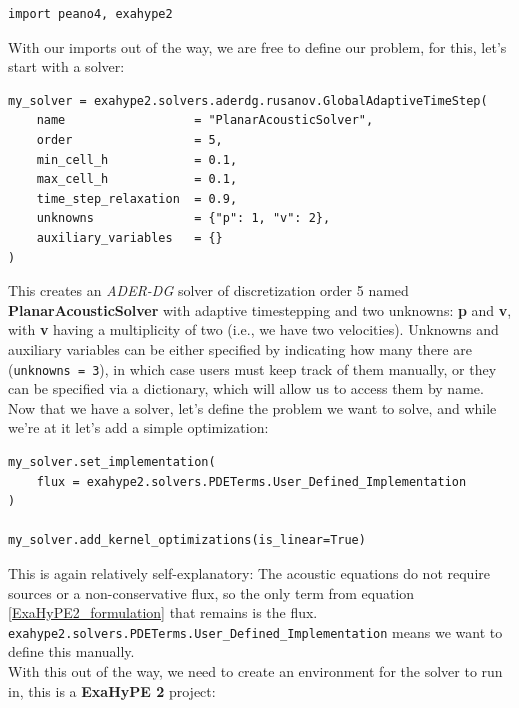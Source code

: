 \documentclass[12pt,letterpaper]{article}
\begin{document}
\begin{lstlisting}[style = Python]
import peano4, exahype2
\end{lstlisting}

With our imports out of the way, we are free to define our problem, for this, let's start with a solver:\\

\begin{lstlisting}[style = Python]
my_solver = exahype2.solvers.aderdg.rusanov.GlobalAdaptiveTimeStep(
    name                  = "PlanarAcousticSolver",
    order                 = 5,
    min_cell_h            = 0.1,
    max_cell_h            = 0.1,
    time_step_relaxation  = 0.9,
    unknowns              = {"p": 1, "v": 2},
    auxiliary_variables   = {}
)
\end{lstlisting}

This creates an \textit{ADER-DG} solver of discretization order 5 named \textbf{PlanarAcousticSolver} with adaptive timestepping and two unknowns:
\textbf{p} and \textbf{v}, with \textbf{v} having a multiplicity of two (i.e., we have two velocities).
Unknowns and auxiliary variables can be either specified by indicating how many there are (\texttt{unknowns = 3}),
in which case users must keep track of them manually, or they can be specified via a dictionary, which will allow us to access them by name.\\

Now that we have a solver, let's define the problem we want to solve, and while we're at it let's add a simple optimization:\\

\begin{lstlisting}[style = Python]
my_solver.set_implementation(
    flux = exahype2.solvers.PDETerms.User_Defined_Implementation
)

my_solver.add_kernel_optimizations(is_linear=True)
\end{lstlisting}

This is again relatively self-explanatory: The acoustic equations do not require sources or a non-conservative flux,
so the only term from equation \ref{ExaHyPE2_formulation} that remains is the flux.
\texttt{exahype2.solvers.PDETerms.User\_Defined\_Implementation} means we want to define this manually.\\
With this out of the way, we need to create an environment for the solver to run in, this is a \textbf{ExaHyPE 2} project:\\
\end{document}

